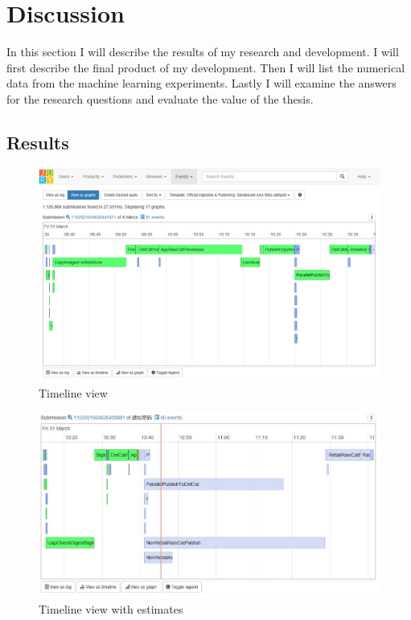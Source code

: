 
\clearpage
\section{Discussion}
\label{sec:discussion}

In this section I will describe the results of my research and development.
I will first describe the final product of my development.
Then I will list the numerical data from the machine learning experiments.
Lastly I will examine the answers for the research questions and
evaluate the value of the thesis. 

\subsection{Results}


\begin{figure}[htb]
\centering \includegraphics[width=\linewidth]{gfx/screenshots/timeline.png}
\caption{Timeline view \label{fig:timeline}}
\end{figure}

\begin{figure}[htb]
\centering \includegraphics[width=\linewidth]{gfx/screenshots/estimates.jpg}
\caption{Timeline view with estimates \label{fig:estimates}}
\end{figure}

